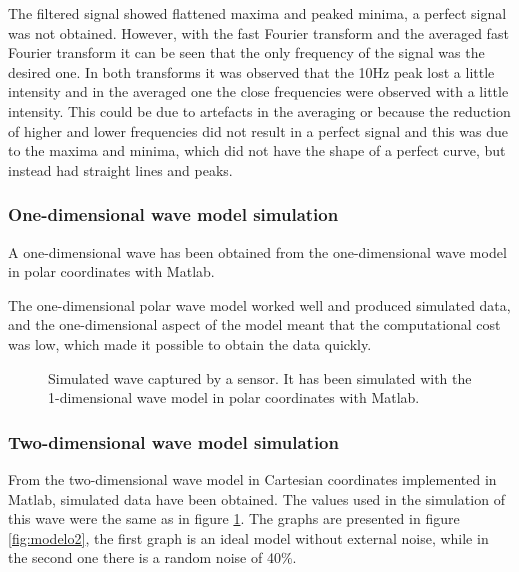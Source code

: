 \documentclass[12pt, a4paper]{article} %
\begin{document}
	The filtered signal showed flattened maxima and peaked minima, a perfect signal was not obtained. However, with the fast Fourier transform and the averaged fast Fourier transform it can be seen that the only frequency of the signal was the desired one. In both transforms it was observed that the 10Hz peak lost a little intensity and in the averaged one the close frequencies were observed with a little intensity. This could be due to artefacts in the averaging or because the reduction of higher and lower frequencies did not result in a perfect signal and this was due to the maxima and minima, which did not have the shape of a perfect curve, but instead had straight lines and peaks.
	
	\setlength{\parskip}{0mm}
	
	\subsubsection{One-dimensional wave model simulation}
	
	\setlength{\parskip}{0mm}
	
	A one-dimensional wave has been obtained from the one-dimensional wave model in polar coordinates with Matlab. 
	
	The one-dimensional polar wave model worked well and produced simulated data, and the one-dimensional aspect of the model meant that the computational cost was low, which made it possible to obtain the data quickly.
	\setlength{\parskip}{4mm}
	\begin{figure}[htbp]
		\centering
		
		\caption{Simulated wave captured by a sensor. It has been simulated with the 1-dimensional wave model in polar coordinates with Matlab.}
		\label{fig:modelo1}
	\end{figure}
	\setlength{\parskip}{0mm}
	
	\subsubsection{Two-dimensional wave model simulation}
	
	From the two-dimensional wave model in Cartesian coordinates implemented in Matlab, simulated data have been obtained. The values used in the simulation of this wave were the same as in figure \ref{fig:modelo1}. The graphs are presented in figure \ref{fig:modelo2}, the first graph is an ideal model without external noise, while in the second one there is a random noise of 40\%.
	
\end{document}
